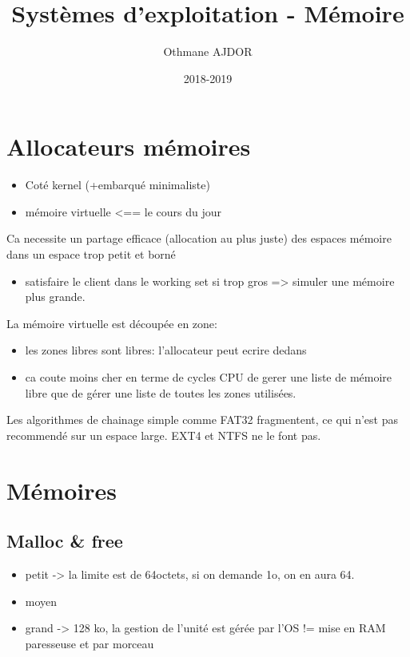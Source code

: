 \documentclass[11pt]{article}
\title{Systèmes d'exploitation - Mémoire}
\author{Othmane AJDOR}
\date{2018-2019}
\begin{document}
\maketitle

\pagebreak
\tableofcontents
\pagebreak

\section{Allocateurs mémoires}
\begin{itemize}
    \item Coté kernel (+embarqué minimaliste)
    \item mémoire virtuelle <== le cours du jour
\end{itemize}

Ca necessite un partage efficace (allocation au plus juste) des espaces mémoire dans un espace trop petit et borné

\begin{itemize}
    \item satisfaire le client dans le working set si trop gros => simuler une mémoire plus grande.
\end{itemize}

La mémoire virtuelle est découpée en zone:
\begin{itemize}
    \item les zones libres sont libres: l'allocateur peut ecrire dedans
    \item ca coute moins cher en terme de cycles CPU de gerer une liste de mémoire libre que de gérer une liste de toutes les zones utilisées.
\end{itemize}

Les algorithmes de chainage simple comme FAT32 fragmentent, ce qui n'est pas recommendé sur un espace large.
EXT4 et NTFS ne le font pas.

\section{Mémoires}
\subsection{Malloc \& free}
\begin{itemize}
    \item petit -> la limite est de 64octets, si on demande 1o, on en aura 64.
    \item moyen
    \item grand -> 128 ko, la gestion de l'unité est gérée par l'OS != mise en RAM paresseuse et par morceau
\end{itemize}
\end{document}
